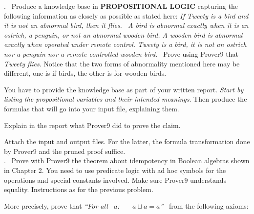 \documentclass[fullapage,12pt]{article}
\begin{document}
. \ Produce a knowledge base in {\bf PROPOSITIONAL LOGIC} capturing the following information as closely as possible as stated here: {\em If Tweety is a bird and it is not an abnormal bird, then it flies. \
A bird is abnormal exactly when it is an ostrich, a penguin, or not an abnormal wooden bird. A wooden bird is abnormal exactly when operated under remote control. Tweety is a bird, it is  not
an ostrich nor a penguin nor a remote controlled wooden bird.}  \ Prove using Prover9 that {\em Tweety flies}. Notice that the two forms of abnormality mentioned here may be different, one is if birds, the other is for wooden birds.

You have to provide the knowledge base as part of your written report. {\em Start by listing the propositional variables and their intended meanings}.  Then produce the formulas that will go into your input file, explaining them.

Explain in the report what Prover9 did to prove the claim.

Attach the input and output files. For the latter, the formula transformation done by Prover9 and the pruned proof suffice.\\

. \ Prove with Prover9 the theorem about idempotency in Boolean algebras shown in Chapter 2. You need to use predicate logic with ad hoc symbols for the operations and special constants involved. Make sure Prover9 understands equality. Instructions as for the previous problem.

More precisely, prove that {\em ``For all \ $a$:~~~ $a \sqcup a
= a$''} \ from the following axioms:
\end{document}
